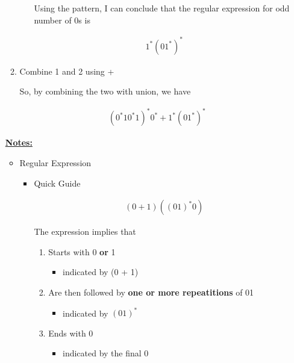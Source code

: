 \documentclass[12pt]{article}
\begin{document}
\begin{enumerate}[a.]
\begin{enumerate}[1.]
\begin{itemize}
            \begin{mdframed}
                Using the pattern, I can conclude that the regular expression for
                odd number of 0s is

                \begin{align}
                    1^*(01^*)^*
                \end{align}
            \end{mdframed}
        \end{itemize}
        \item Combine 1 and 2 using +

        \begin{mdframed}
            So, by combining the two with union, we have

            \begin{align}
            (0^*10^*1)^*0^* + 1^*(01^*)^*
            \end{align}

        \end{mdframed}
    \end{enumerate}

    \bigskip

    \underline{\textbf{Notes:}}

    \bigskip

    \begin{itemize}
        \item Regular Expression
        \begin{itemize}
            \item Quick Guide

            \begin{align}
                (0+1)((01)^*0)
            \end{align}

            \bigskip

            The expression implies that

            \bigskip

            \begin{enumerate}[1.]
                \item Starts with 0 \textbf{or} 1
                \begin{itemize}
                    \item indicated by (0 + 1)
                \end{itemize}
                \item Are then followed by \textbf{one or more repeatitions} of 01
                \begin{itemize}
                    \item indicated by $(01)^*$
                \end{itemize}
                \item Ends with 0
                \begin{itemize}
                    \item indicated by the final 0
                \end{itemize}
            \end{enumerate}
        \end{itemize}


\end{itemize}
\end{enumerate}
\end{document}
